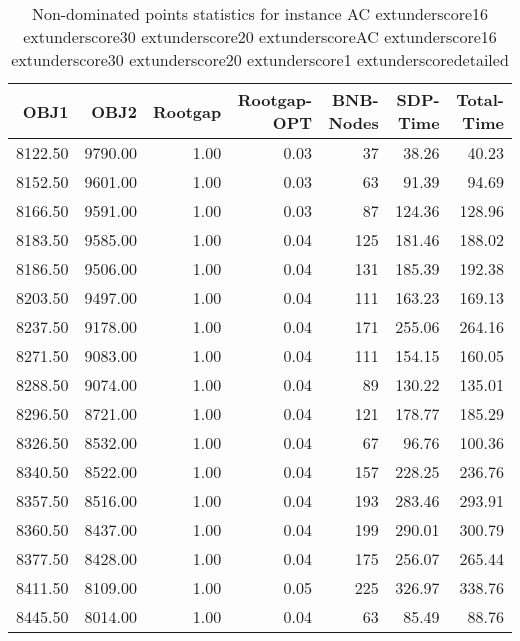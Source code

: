 \begin{table}
\caption{Non-dominated points statistics for instance AC	extunderscore16	extunderscore30	extunderscore20	extunderscoreAC	extunderscore16	extunderscore30	extunderscore20	extunderscore1	extunderscoredetailed}
\label{tab:stats/AC_16_30_20_AC_16_30_20_1_detailed}
\begin{tabular}{rrrrrrr}
\toprule
OBJ1 & OBJ2 & Rootgap & Rootgap-OPT & BNB-Nodes & SDP-Time & Total-Time \\
\midrule
8122.50 & 9790.00 & 1.00 & 0.03 & 37 & 38.26 & 40.23 \\
8152.50 & 9601.00 & 1.00 & 0.03 & 63 & 91.39 & 94.69 \\
8166.50 & 9591.00 & 1.00 & 0.03 & 87 & 124.36 & 128.96 \\
8183.50 & 9585.00 & 1.00 & 0.04 & 125 & 181.46 & 188.02 \\
8186.50 & 9506.00 & 1.00 & 0.04 & 131 & 185.39 & 192.38 \\
8203.50 & 9497.00 & 1.00 & 0.04 & 111 & 163.23 & 169.13 \\
8237.50 & 9178.00 & 1.00 & 0.04 & 171 & 255.06 & 264.16 \\
8271.50 & 9083.00 & 1.00 & 0.04 & 111 & 154.15 & 160.05 \\
8288.50 & 9074.00 & 1.00 & 0.04 & 89 & 130.22 & 135.01 \\
8296.50 & 8721.00 & 1.00 & 0.04 & 121 & 178.77 & 185.29 \\
8326.50 & 8532.00 & 1.00 & 0.04 & 67 & 96.76 & 100.36 \\
8340.50 & 8522.00 & 1.00 & 0.04 & 157 & 228.25 & 236.76 \\
8357.50 & 8516.00 & 1.00 & 0.04 & 193 & 283.46 & 293.91 \\
8360.50 & 8437.00 & 1.00 & 0.04 & 199 & 290.01 & 300.79 \\
8377.50 & 8428.00 & 1.00 & 0.04 & 175 & 256.07 & 265.44 \\
8411.50 & 8109.00 & 1.00 & 0.05 & 225 & 326.97 & 338.76 \\
8445.50 & 8014.00 & 1.00 & 0.04 & 63 & 85.49 & 88.76 \\
\bottomrule
\end{tabular}
\end{table}
